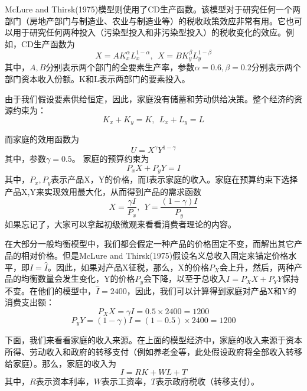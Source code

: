 \documentclass[cn,12pt,math=newtx,citestyle=gb7714-2015,bibstyle=gb7714-2015]{elegantbook}
\begin{document}
	McLure and Thirsk(1975)模型则使用了CD生产函数。该模型对于研究任何一个两部门（房地产部门与制造业、农业与制造业等）的税收政策效应非常有用。它也可以用于研究任何两种投入（污染型投入和非污染型投入）的税收变化的效应。例如，CD生产函数为
	\begin{equation}
		X=AK_x^\alpha L_x^{1-\alpha},~~X=BK_y^\beta L_y^{1-\beta}
	\end{equation}
	其中，$A,B$分别表示两个部门的全要素生产率，参数$\alpha=0.6,\beta=0.2$分别表示两个部门资本收入份额。K和L表示两部门的要素投入。
	
	由于我们假设要素供给恒定，因此，家庭没有储蓄和劳动供给决策。整个经济的资源约束为：
	\begin{equation}
		K_x+K_y=K,~~L_x+L_y=L
	\end{equation}
	
	而家庭的效用函数为
	\begin{equation}
		U=X^\gamma Y^{1-\gamma}
	\end{equation}
	其中，参数$\gamma=0.5$。
	家庭的预算约束为
	\begin{equation}
		P_xX+P_yY=I
	\end{equation}
	其中，$P_x,P_y$表示产品X，Y的价格，而I表示家庭的收入。家庭在预算约束下选择产品X,Y来实现效用最大化，从而得到产品的需求函数
	\begin{equation}
		X=\frac{\gamma I}{P_x},~~Y=\frac{(1-\gamma) I}{P_y}
	\end{equation}
	如果忘记了，大家可以拿起初级微观来看看消费者理论的内容。
	
	在大部分一般均衡模型中，我们都会假定一种产品的价格固定不变，而解出其它产品的相对价格。但是McLure and Thirsk(1975)假设名义总收入固定来锚定价格水平，即$I=\hat{I}$。因此，如果对产品X征税，那么，X的价格$P_X$会上升，然后，两种产品的均衡数量会发生变化，Y的价格$P_y$会下降，以至于总收入$I=P_XX+P_YY$保持不变。在他们的模型中，$\hat{I}=2400$，因此，我们可以计算得到家庭对产品X和Y的消费支出额：
	\begin{equation}
		P_XX=\gamma I=0.5 \times 2400=1200
	\end{equation}
	\begin{equation}
		P_yY=(1-\gamma) I=(1-0.5) \times 2400=1200
	\end{equation}
	
	下面，我们来看看家庭的收入来源。在上面的模型经济中，家庭的收入来源于资本所得、劳动收入和政府的转移支付（例如养老金等，此处假设政府将全部收入转移给家庭）。那么，家庭的收入为
	\begin{equation}
		I=RK+WL+T
	\end{equation}
	其中，$R$表示资本利率，$W$表示工资率，$T$表示政府税收（转移支付）。
	
\end{document}
